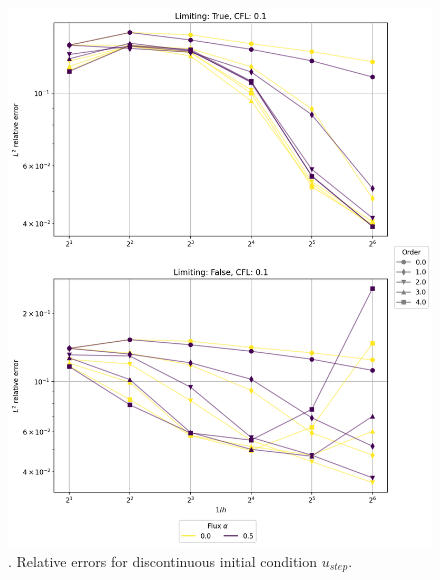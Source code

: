 \begin{figure}[p!]
	\centering
	\includegraphics[width=1.1\textwidth]{../figs/parametric/advection_1D/advection_1D_step_reduced.png}
	\caption{. Relative errors for discontinuous initial 
	condition $u_{step}$.}
	\label{fig:adv_conv_1D_step}
\end{figure}
